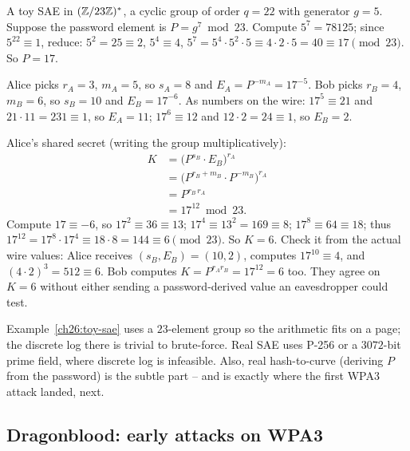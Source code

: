 \begin{example}
\label{ch26:toy-sae}
A toy SAE in $(\mathbb{Z}/23\mathbb{Z})^{*}$, a cyclic group of order $q = 22$ with generator $g = 5$.
Suppose the password element is $P = g^{7} \bmod 23$. Compute $5^7 = 78125$; since
$5^{22} \equiv 1$, reduce: $5^2 = 25 \equiv 2$, $5^4 \equiv 4$, $5^7 = 5^4 \cdot
5^2 \cdot 5 \equiv 4 \cdot 2 \cdot 5 = 40 \equiv 17 \pmod{23}$. So $P = 17$.

Alice picks $r_A = 3$, $m_A = 5$, so $s_A = 8$ and $E_A = P^{-m_A} = 17^{-5}$.
Bob picks $r_B = 4$, $m_B = 6$, so $s_B = 10$ and $E_B = 17^{-6}$.
As numbers on the wire: $17^5 \equiv 21$ and $21 \cdot 11 = 231 \equiv 1$, so $E_A = 11$;
$17^6 \equiv 12$ and $12 \cdot 2 = 24 \equiv 1$, so $E_B = 2$.

Alice's shared secret (writing the group multiplicatively):
\begin{align*}
  K &= \bigl(P^{s_B} \cdot E_B\bigr)^{r_A} \\
    &= \bigl(P^{r_B + m_B} \cdot P^{-m_B}\bigr)^{r_A} \\
    &= P^{r_B \, r_A} \\
    &= 17^{12} \bmod 23.
\end{align*}
Compute $17 \equiv -6$, so $17^2 \equiv 36 \equiv 13$; $17^4 \equiv 13^2 = 169
\equiv 8$; $17^8 \equiv 64 \equiv 18$; thus $17^{12} = 17^8 \cdot 17^4 \equiv 18
\cdot 8 = 144 \equiv 6 \pmod{23}$. So $K = 6$. Check it from the actual wire values: Alice receives $(s_B, E_B) = (10, 2)$, computes $17^{10} \equiv 4$, and $(4 \cdot 2)^3 = 512 \equiv 6$. Bob computes $K = P^{r_A r_B} =
17^{12} = 6$ too. They agree on $K = 6$ without either sending a password-derived
value an eavesdropper could test.
\end{example}

\begin{trapbox}
Example~\ref{ch26:toy-sae} uses a $23$-element group so the arithmetic fits on a
page; the discrete log there is trivial to brute-force. Real SAE uses P-256 or a
$3072$-bit prime field, where discrete log is infeasible. Also, real hash-to-curve
(deriving $P$ from the password) is the subtle part -- and is exactly where the
first WPA3 attack landed, next.
\end{trapbox}

\subsection{Dragonblood: early attacks on WPA3}


